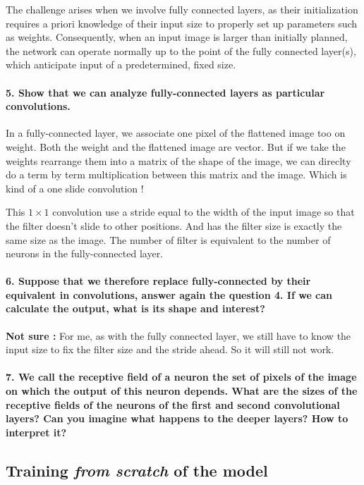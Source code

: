 \documentclass{article}
\theoremstyle{plain}%
\theoremstyle{definition}
\theoremstyle{remark}
\begin{document}
The challenge arises when we involve fully connected layers, as their initialization requires a priori knowledge of their input size to properly set up parameters such as weights. Consequently, when an input image is larger than initially planned, the network can operate normally up to the point of the fully connected layer(s), which anticipate input of a predetermined, fixed size.

\paragraph{5. Show that we can analyze fully-connected layers as particular convolutions.}
In a fully-connected layer, we associate one pixel of the flattened image too on weight. Both the weight and the flattened image are vector. But if we take the weights rearrange them into a matrix of the shape of the image, we can direclty do a term by term multiplication between this matrix and the image. Which is kind of a one slide convolution ! 

This $1 \times 1$ convolution use a stride equal to the width of the input image so that the filter doesn't slide to other positions. And has the filter size is exactly the same size as the image. The number of filter is equivalent to the number of neurons in the fully-connected layer.

\paragraph{6. Suppose that we therefore replace fully-connected by their equivalent in convolutions, answer again the question 4. If we can calculate the output, what is its shape and interest?}
\textbf{Not sure : }
For me, as with the fully connected layer,  we still have to know the input size to fix the filter size and the stride ahead. So it will still not work.

\paragraph{7. We call the receptive field of a neuron the set of pixels of the image on which the output of this neuron depends. What are the sizes of the receptive fields of the neurons of the first and second convolutional layers? Can you imagine what happens to the deeper layers? How to interpret it?}

\subsection{Training \textit{from scratch} of the model}
\end{document}

